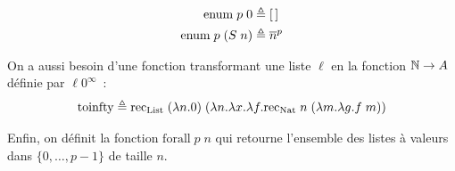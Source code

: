 \documentclass{article}
\begin{document}
\begin{align*}
    \mathrm{enum}\;p\;0 &\triangleq [\,]\\
    \mathrm{enum}\;p\;(S\;n) &\triangleq \overline{n}^{p}
\end{align*}

On a aussi besoin d'une fonction transformant une liste $\ell$ en la fonction $\mathbb{N} \to A$ définie par $\ell 0^\infty$~:
\[\mathrm{toinfty} \triangleq \mathrm{rec}_{\mathrm{List}}\;(\lambda n.0)\;(\lambda n.\lambda x.\lambda f.\mathrm{rec}_{\mathrm{Nat}}\;n\;(\lambda m.\lambda g.f\;m))\]

Enfin, on définit la fonction $\mathrm{forall}\;p\;n$ qui retourne l'ensemble des listes à valeurs dans $\{0,\ldots,p-1\}$ de taille $n$.



\end{document}

